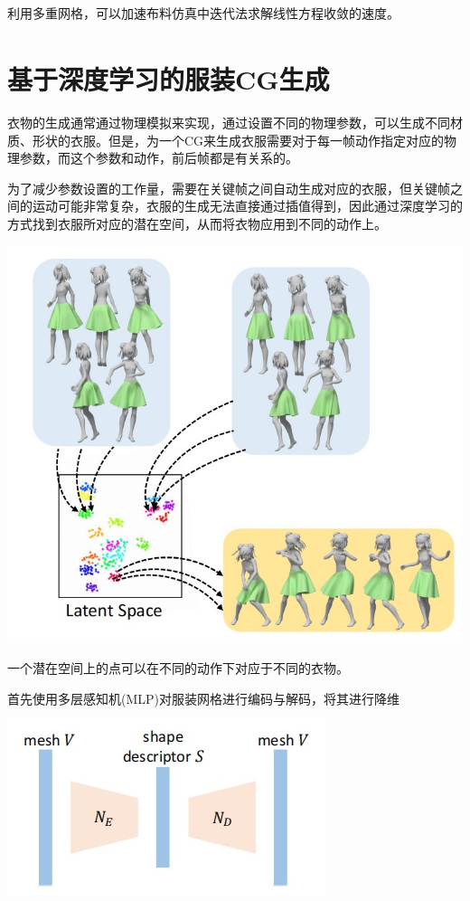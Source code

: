 \documentclass{CLGPY}
\begin{document}
\begin{multicols}{2}
		利用多重网格，可以加速布料仿真中迭代法求解线性方程收敛的速度。


		\section{基于深度学习的服装CG生成\textsuperscript{\cite{7}}}
		衣物的生成通常通过物理模拟来实现，通过设置不同的物理参数，可以生成不同材质、形状的衣服。但是，为一个CG来生成衣服需要对于每一帧动作指定对应的物理参数，而这个参数和动作，前后帧都是有关系的。

		为了减少参数设置的工作量，需要在关键帧之间自动生成对应的衣服，但关键帧之间的运动可能非常复杂，衣服的生成无法直接通过插值得到，因此通过深度学习的方式找到衣服所对应的潜在空间，从而将衣物应用到不同的动作上。
        \begin{center}
            \includegraphics[width=1.0\linewidth]{./fig/潜在空间.jpg}
        \end{center}

		一个潜在空间上的点可以在不同的动作下对应于不同的衣物。

		首先使用多层感知机(MLP)对服装网格进行编码与解码，将其进行降维
        \begin{center}
            \includegraphics[width=1.0\linewidth]{./fig/多层感知机.jpg}
        \end{center}


\end{multicols}
\end{document}
